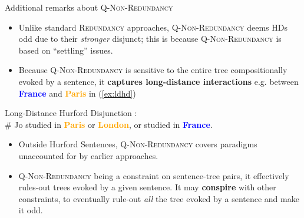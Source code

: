 \documentclass[10pt]{beamer}
\newcommand{\stronger}[1]{\textbf{\textcolor{orange}{#1}}}
\newcommand{\Paris}{\textbf{\textcolor{orange}{Paris}}}
\newcommand{\France}{\textbf{\textcolor{blue}{France}}}
\begin{document}
\begin{frame}{Additional remarks about \textsc{Q-Non-Redundancy}}
	\begin{itemize}
		\item Unlike standard \textsc{Redundancy} approaches, \textsc{Q-Non-Redundancy} deems HDs odd due to their \textit{stronger} disjunct; this is because \textsc{Q-Non-Redundancy} is based on ``settling'' issues.
		\item Because \textsc{Q-Non-Redundancy} is sensitive to the entire tree compositionally evoked by a sentence, it \textbf{captures long-distance interactions} e.g. between \France{} and \Paris{} in (\ref{ex:ldhd})
	\end{itemize}
		\begin{exe}
			\ex\label{ex:ldhd}{Long-Distance Hurford Disjunction \citep{Marty2022}:\\\# Jo studied in \Paris{} or \stronger{London}, or studied in \France.}
		\end{exe}
	\begin{itemize}
		\item Outside Hurford Sentences, \textsc{Q-Non-Redundancy} covers paradigms unaccounted for by earlier approaches.
		\item \textsc{Q-Non-Redundancy} being a constraint on sentence-tree pairs, it effectively rules-out trees evoked by a given sentence. It may \textbf{conspire} with other constraints, to eventually rule-out \textit{all} the tree evoked by a sentence and make it odd.
	\end{itemize}
\end{frame}
\end{document}
